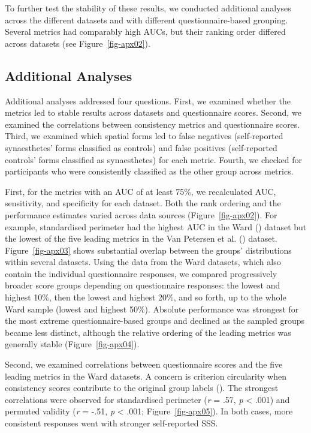 \documentclass[
  man,
  floatsintext,
  longtable,
  nolmodern,
  notxfonts,
  notimes,
  colorlinks=true,linkcolor=blue,citecolor=blue,urlcolor=blue]{apa7}
\begin{document}
To further test the stability of these results, we conducted additional
analyses across the different datasets and with different
questionnaire-based grouping. Several metrics had comparably high AUCs,
but their ranking order differed across datasets (see
Figure~\ref{fig-apx02}).

\subsection{Additional Analyses}\label{additional-analyses}

Additional analyses addressed four questions. First, we examined whether
the metrics led to stable results across datasets and questionnaire
scores. Second, we examined the correlations between consistency metrics
and questionnaire scores. Third, we examined which spatial forms led to
false negatives (self-reported synaesthetes' forms classified as
controls) and false positives (self-reported controls' forms classified
as synaesthetes) for each metric. Fourth, we checked for participants
who were consistently classified as the other group across metrics.

First, for the metrics with an AUC of at least 75\%, we recalculated
AUC, sensitivity, and specificity for each dataset. Both the rank
ordering and the performance estimates varied across data sources
(Figure~\ref{fig-apx02}). For example, standardised perimeter had the
highest AUC in the Ward () dataset but the
lowest of the five leading metrics in the Van Petersen et al.
() dataset. Figure~\ref{fig-apx03}
shows substantial overlap between the groups' distributions within
several datasets. Using the data from the Ward datasets, which also
contain the individual questionnaire responses, we compared
progressively broader score groups depending on questionnaire responses:
the lowest and highest 10\%, then the lowest and highest 20\%, and so
forth, up to the whole Ward sample (lowest and highest 50\%). Absolute
performance was strongest for the most extreme questionnaire-based
groups and declined as the sampled groups became less distinct, although
the relative ordering of the leading metrics was generally stable
(Figure~\ref{fig-apx04}).

Second, we examined correlations between questionnaire scores and the
five leading metrics in the Ward datasets. A concern is criterion
circularity when consistency scores contribute to the original group
labels (). The strongest
correlations were observed for standardised perimeter (\emph{r} = .57,
\emph{p} \textless{} .001) and permuted validity (\emph{r} = -.51,
\emph{p} \textless{} .001; Figure~\ref{fig-apx05}). In both cases, more
consistent responses went with stronger self-reported SSS.
\end{document}
